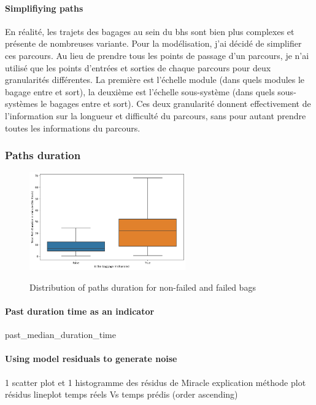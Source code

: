 \documentclass[12pt]{article}
\begin{document}
\paragraph{Simplifiying paths} En réalité, les trajets des bagages au sein du \acrshort{bhs} sont bien plus complexes et présente de nombreuses variante. Pour la modélisation, j'ai décidé de simplifier ces parcours. Au lieu de prendre tous les points de passage d'un parcours, je n'ai utilisé que les points d'entrées et sorties de chaque parcours pour deux granularités différentes. La première est l'échelle module (dans quels modules le bagage entre et sort), la deuxième est l'échelle sous-système (dans quels sous-systèmes le bagages entre et sort). Ces deux granularité donnent effectivement de l'information sur la longueur et difficulté du parcours, sans pour autant prendre toutes les informations du parcours.  





\subsubsection{Paths duration}\label{subsubsec:Paths duration}



\begin{figure}[h]
    \centering
    \includegraphics[width=0.6\textwidth]{Boxplot path duration per failed status.png}\\
    \caption{Distribution of paths duration for non-failed and failed bags}
\end{figure}
\FloatBarrier


\paragraph{Past duration time as an indicator} past\_median\_duration\_time


\paragraph{Using model residuals to generate noise}
1 scatter plot et 1 histogramme des résidus de Miracle
explication méthode
plot résidus
lineplot temps réels Vs temps prédis (order ascending)
\end{document}
